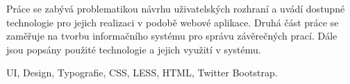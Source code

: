 \documentclass[11pt,oneside]{fithesis2}
\begin{document}
\FrontMatter
\ThesisTitlePage

\begin{ThesisDeclaration}
    \DeclarationText
    \AdvisorName
\end{ThesisDeclaration}

\begin{ThesisAbstract}
    Práce se zabývá problematikou návrhu uživatelských rozhraní a uvádí dostupné technologie pro jejich realizaci v podobě webové aplikace. Druhá část práce se zaměřuje na tvorbu informačního systému pro správu závěrečných prací. Dále jsou popsány použité technologie a jejich využití v systému.
\end{ThesisAbstract}

\begin{ThesisKeyWords}
    UI, Design, Typografie, CSS, LESS, HTML, Twitter Bootstrap.
\end{ThesisKeyWords}

\MainMatter

\tableofcontents











\appendix


\end{document}
